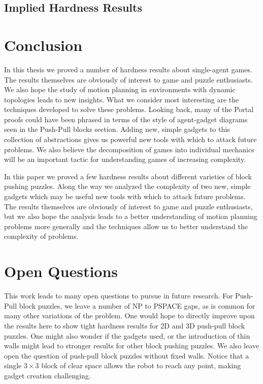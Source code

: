 \subsection{Implied Hardness Results}

\section{Conclusion}
In this thesis we proved a number of hardness results about single-agent games. The results themselves are obviously of interest to game and puzzle enthusiasts. We also hope the study of motion planning in environments with dynamic topologies leads to new insights. What we consider most interesting are the techniques developed to solve these problems. Looking back, many of the Portal proofs could have been phrased in terms of the style of agent-gadget diagrams seen in the Push-Pull blocks section. Adding new, simple gadgets to this collection of abstractions gives us powerful new tools with which to attack future problems. We also believe the decomposition of games into individual mechanics will be an important tactic for understanding games of increasing complexity.

In this paper we proved a few hardness results about different varieties of block pushing puzzles. Along the way we analyzed the complexity of two new, simple gadgets which may be useful new tools with which to attack future problems. The results themselves are obviously of interest to game and puzzle enthusiasts, but we also hope the analysis leads to a better understanding of motion planning problems more generally and the techniques allow us to better understand the complexity of problems.

\section{Open Questions}
This work leads to many open questions to pursue in future research. For Push-Pull block puzzles, we leave a number of NP to PSPACE gaps, as is common for many other variations of the problem. One would hope to directly improve upon the results here to show tight hardness results for 2D and 3D push-pull block puzzles. One might also wonder if the gadgets used, or the introduction of thin walls might lead to stronger results for other block pushing puzzles. We also leave open the question of push-pull block puzzles without fixed walls. Notice that a single $3\times3$ block of clear space allows the robot to reach any point, making gadget creation challenging.

